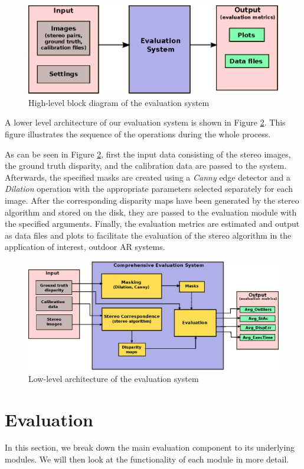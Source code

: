 \begin{figure}[H]
\centering
\includegraphics{EvalSyshigh}
\caption{High-level block diagram of the evaluation system}
\label{fig:higharch}
\end{figure} 
\noindent
A lower level architecture of our evaluation system is shown in Figure \ref{fig:lowarch}. This figure illustrates the 
sequence of the operations during the whole process. 

As can be seen in Figure \ref{fig:lowarch}, first the input data consisting of the stereo images, the ground truth disparity, and 
the calibration data are passed to the system.
Afterwards, the specified masks are created using a \textit{Canny} edge detector and a \textit{Dilation} operation with the appropriate parameters 
selected separately for each image.
After the corresponding disparity maps have been generated by the stereo algorithm and stored on the disk, 
they are passed to the evaluation module with the specified arguments.
Finally, the evaluation metrics are estimated and output as data files and plots to facilitate the evaluation of the stereo algorithm in the application
of interest, outdoor AR systems.

\begin{figure}[H]
\centering
\includegraphics{EvalSyslow}
\caption{Low-level architecture of the evaluation system}
\label{fig:lowarch}
\end{figure} 

\section{Evaluation}
In this section, we break down the main evaluation component to its underlying modules. We will then look at the functionality of each
module in more detail.

